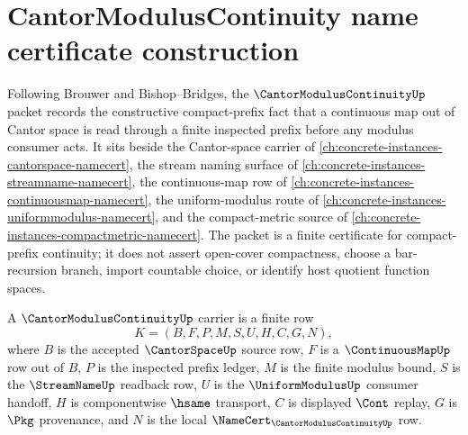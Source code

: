 \chapter{CantorModulusContinuity name certificate construction}
\label{ch:concrete-instances-cantor-modulus-continuity-namecert}

Following Brouwer and Bishop--Bridges, the $\CantorModulusContinuityUp$ packet records the constructive compact-prefix fact that a continuous map out of Cantor space is read through a finite inspected prefix before any modulus consumer acts. It sits beside the Cantor-space carrier of \autoref{ch:concrete-instances-cantorspace-namecert}, the stream naming surface of \autoref{ch:concrete-instances-streamname-namecert}, the continuous-map row of \autoref{ch:concrete-instances-continuousmap-namecert}, the uniform-modulus route of \autoref{ch:concrete-instances-uniformmodulus-namecert}, and the compact-metric source of \autoref{ch:concrete-instances-compactmetric-namecert}. The packet is a finite certificate for compact-prefix continuity; it does not assert open-cover compactness, choose a bar-recursion branch, import countable choice, or identify host quotient function spaces.

\begin{definition}
\label{def:cantor-modulus-continuity-carrier}
A $\CantorModulusContinuityUp$ carrier is a finite row
$$
K=(B,F,P,M,S,U,H,C,G,N),
$$
where $B$ is the accepted $\CantorSpaceUp$ source row, $F$ is a $\ContinuousMapUp$ row out of $B$, $P$ is the inspected prefix ledger, $M$ is the finite modulus bound, $S$ is the $\StreamNameUp$ readback row, $U$ is the $\UniformModulusUp$ consumer handoff, $H$ is componentwise $\hsame$ transport, $C$ is displayed $\Cont$ replay, $G$ is $\Pkg$ provenance, and $N$ is the local $\NameCert_{\CantorModulusContinuityUp}$ row.
\end{definition}

